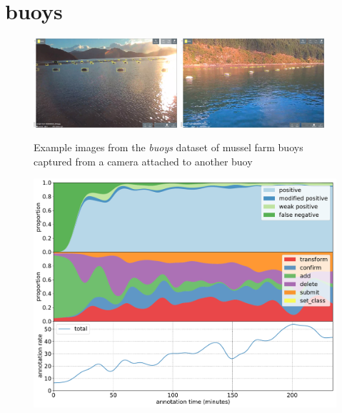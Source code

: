 \pagebreak
\section{buoys}

\begin{figure}[H]
  \includegraphics[width=0.475\textwidth]{figures/annotation/screenshots/buoys.png}
  \hfill
  \includegraphics[width=0.475\textwidth]{figures/annotation/screenshots/buoys2.png}
  \caption{Example images from the \emph{buoys} dataset of mussel farm buoys captured from a camera attached to another buoy }
  \label{fig:buoys_dataset}
\end{figure}

\begin{figure}[!h]
\centering
\includegraphics[width=1.0\linewidth]{charts/action_annotations/buoys.pdf}
\caption{  }
\label{fig:buoys_annotation}
\end{figure}


